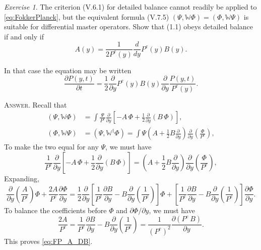 \documentclass{book}
\numberwithin{equation}{section}
\theoremstyle{plain}
\theoremstyle{definition}
\theoremstyle{remark}
\theoremstyle{BoldStyle}
\newtheorem{exercise}{Exercise}
\numberwithin{exercise}{section}
\newcommand{\answer}[1]{{\color{DarkBlue}\footnotesize \textsc{Answer.} #1}}
\begin{document}
\begin{exercise}
  The criterion (V.6.1) for detailed balance
  cannot readily be applied to \eqref{eq:FokkerPlanck},
  but the equivalent formula (V.7.5)
  $(\Psi, \mathbb W \Phi) = (\Phi, \mathbb W \Psi)$
  is suitable
  for differential master operators.
  Show that (1.1) obeys detailed balance if and only if
  \begin{equation}
    A(y) = \frac{ 1 } { 2 P^e(y) } \frac{d }{ dy} P^e(y) B(y).
    \label{eq:FP_A_DB}
  \end{equation}

  In that case the equation may be written
  \begin{equation}
    \frac{ \partial P(y, t) } { \partial t }
    =
    \frac 1 2 \frac { \partial } { \partial y }
    P^e(y) B(y) \frac{ \partial } { \partial y }
    \frac{ P(y, t) } { P^e(y) }.
    \label{eq:FP_P_DB}
  \end{equation}

  \answer{Recall that
    $$
    \begin{aligned}
    (\Psi, \mathbb W\Phi)
    &= \int \frac{\Psi}{P^e}
    \frac{ \partial } { \partial y }
    \left[
      -A \, \Phi + \frac{1}{2}\frac{ \partial } { \partial y } (B \, \Phi)
    \right], \\
    (\Phi, \mathbb W \Psi)
    &=
    (\Psi, \mathbb W^\dag \Phi)
    =
    \int
    \Psi
    \left(
      A
      + \frac{1}{2} B \frac{ \partial } { \partial y }
    \right)
    \frac{ \partial } { \partial y }
    \left( \frac{ \Phi } { P^e} \right),
    \end{aligned}
    $$
    To make the two equal for any $\Psi$, we must have
    $$
    \frac{ 1 } {P^e}
    \frac{ \partial } { \partial y }
    \left[
      -A \, \Phi + \frac{1}{2}\frac{ \partial } { \partial y } (B \, \Phi)
    \right]
    =
    \left(
      A
      + \frac{1}{2} B \frac{ \partial } { \partial y }
    \right)
    \frac{ \partial } { \partial y }
    \left( \frac{ \Phi } { P^e} \right),
    $$
    Expanding,
    $$
    \frac{ \partial } { \partial y }
    \left( \frac{ A } { P^e } \right)
    \Phi
    +
    \frac{ 2 A } { P^e }
    \frac{ \partial \Phi } { \partial y }
    =
    \frac{1}{2}
    \frac{ \partial } { \partial y}
    \left[
      \frac{1 }{ P^e}
      \frac{ \partial B } { \partial y }
      -
      B
      \frac{ \partial } { \partial y }
      \left(
        \frac{ 1 } { P^e }
      \right)
    \right] \Phi
    +
    \left[
      \frac{1}{P^e}
      \frac{ \partial B } { \partial y }
      -
      B
      \frac{ \partial } { \partial y }
      \left(
        \frac{1} { P^e }
      \right)
    \right]
    \frac{ \partial \Phi } { \partial y }.
    $$
    To balance the coefficients before
    $\Phi$ and $\partial \Phi/\partial y$,
    we must have
    $$
    \frac{2A}{P^e}
    =
    \frac{1}{P^e}
    \frac{\partial B}{\partial y}
    -
    B \frac{\partial}{\partial y}
    \left(
      \frac{1}{P^e}
    \right)
    =
    \frac{1}{(P^e)^2}
    \frac{ \partial ( P^e \, B) }{ \partial y }.
    $$
    This proves \eqref{eq:FP_A_DB}.

}
\end{exercise}
\end{document}
